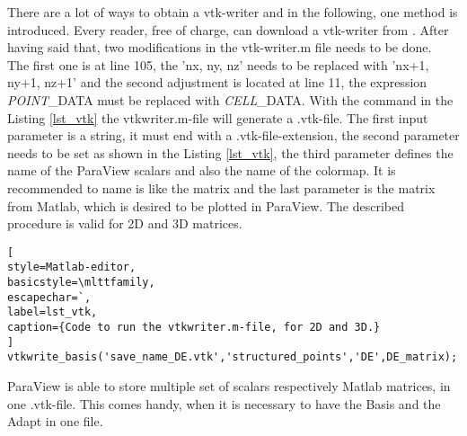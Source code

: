 There are a lot of ways to obtain a vtk-writer and in the following, one method is introduced. Every reader, free of charge, can download a vtk-writer from \cite{.}. After having said that, two  modifications in the vtk-writer.m file needs to be done. \\

The first one is at line 105, the 'nx, ny, nz' needs to be replaced with 'nx+1, ny+1, nz+1' and the second adjustment is located at line 11, the expression \emph{POINT}\_DATA must be replaced with \emph{CELL}\_DATA.
With the command in the Listing \ref{lst_vtk} the vtkwriter.m-file will generate a .vtk-file. The first input parameter is a string, it must end with a .vtk-file-extension, the second parameter needs to be set as shown in  the Listing \ref{lst_vtk}, the third parameter  defines the name of the ParaView scalars and also the name of the colormap. It is recommended to name is like the matrix and the last parameter is the matrix from Matlab, which is desired to be plotted in ParaView. The described procedure is valid for 2D and 3D matrices.

\begin{lstlisting}[
style=Matlab-editor,
basicstyle=\mlttfamily,
escapechar=`,
label=lst_vtk,
caption={Code to run the vtkwriter.m-file, for 2D and 3D.}
]
vtkwrite_basis('save_name_DE.vtk','structured_points','DE',DE_matrix);
\end{lstlisting}
 
 ParaView is able to store multiple set of scalars respectively Matlab matrices, in one .vtk-file. This comes handy, when it is necessary to have the Basis and the Adapt in one file.


